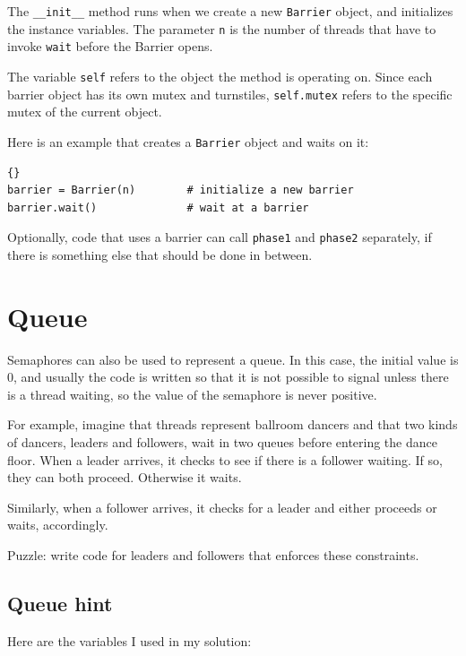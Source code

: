 \documentclass{book}
\newcommand{\clearemptydoublepage}{\newpage\cleardoublepage}
\begin{document}
The {\tt \_\_init\_\_} method runs when we create a new
{\tt Barrier} object, and initializes the instance variables.
The parameter {\tt n} is the number of threads that have
to invoke {\tt wait} before the Barrier opens.

The variable {\tt self} refers to the object the method
is operating on.  Since each barrier object has its own
mutex and turnstiles, {\tt self.mutex} refers to the specific
mutex of the current object.

Here is an example that creates a {\tt Barrier}
object and waits on it:

\begin{lstlisting}[caption={Barrier interface}]{}
barrier = Barrier(n)        # initialize a new barrier
barrier.wait()              # wait at a barrier
\end{lstlisting}

Optionally, code that uses a barrier can call {\tt phase1} and
{\tt phase2} separately, if there is something else that
should be done in between.



\section{Queue}
\label{dancers}

Semaphores can also be used to represent a queue.  In this
case, the initial value is 0, and usually the code is written
so that it is not possible
to signal unless there is a thread waiting, so the value of the
semaphore is never positive.

For example, imagine that threads represent ballroom dancers
and that two kinds of dancers, leaders and followers, wait
in two queues before entering the dance floor.  When a leader
arrives, it checks to see if there is a follower waiting.
If so, they can both proceed.  Otherwise it waits.

Similarly, when a follower arrives, it checks for a leader and
either proceeds or waits, accordingly.

Puzzle: write code for leaders and followers that enforces these
constraints.



\clearemptydoublepage
\subsection {Queue hint}

Here are the variables I used in my solution:
\end{document}
